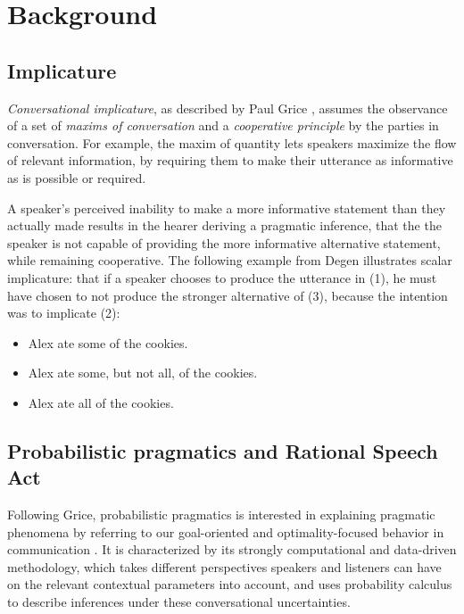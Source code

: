 \documentclass[11pt]{article}
\begin{document}
\section{Background}
\label{Background}

\subsection{Implicature}
\textit{Conversational implicature}, as described by Paul Grice \cite{grice1975}, assumes the observance of a set of \textit{maxims of conversation} and a \textit{cooperative principle} by the parties in conversation. For example, the maxim of quantity lets speakers maximize the flow of relevant information, by requiring them to make their utterance as informative as is possible or required.

A speaker's perceived inability to make a more informative statement than they actually made results in the hearer deriving a pragmatic inference, that the the speaker is not capable of providing the more informative alternative statement, while remaining cooperative. The following example from Degen \cite{degen2023} illustrates scalar implicature: that if a speaker chooses to produce the utterance in (1), he must have chosen to not produce the stronger alternative of (3), because the intention was to implicate (2):

\begin{itemize}[noitemsep]
    \item[(1)] Alex ate some of the cookies.
    \item[(2)] Alex ate some, but not all, of the cookies.
    \item[(3)] Alex ate all of the cookies.
\end{itemize}

\subsection{Probabilistic pragmatics and Rational Speech Act}
Following Grice, probabilistic pragmatics is interested in explaining pragmatic phenomena by referring to our goal-oriented and optimality-focused behavior in communication \cite{frankejaeger2016}. It is characterized by its strongly computational and data-driven methodology, which takes different perspectives speakers and listeners can have on the relevant contextual parameters into account, and uses probability calculus to describe inferences under these conversational uncertainties.
\end{document}
